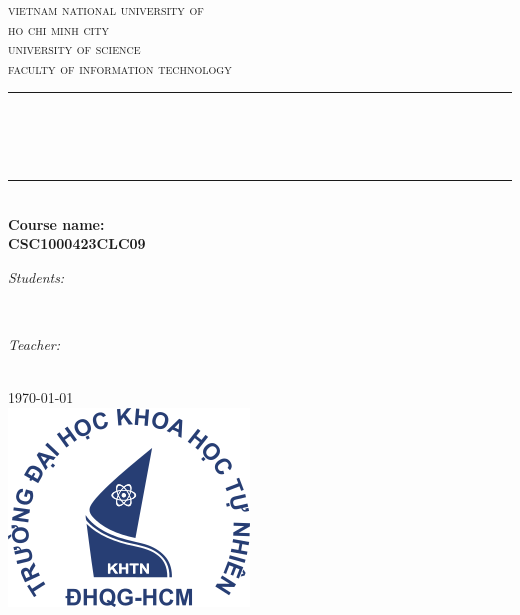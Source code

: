 \begin{titlepage}
\newcommand{\HRule}{\rule{\linewidth}{0.5mm}}
\centering

\textsc{\LARGE vietnam national university of \\ho chi minh city}\\[0.8cm]
\textsc{\Large university of science}\\[0.4cm]
\textsc{\large faculty of information technology}\\[0.4cm]

\HRule \\[0.4cm]
{ 
\Large{\bfseries{\reporttitle}}\\[0.4cm]
\huge{\bfseries{\reportname}}
}\\[0.4cm]
\HRule \\[0.4cm]

\textbf{\large Course name: \coursename}\\[0.4cm]
\textbf{\large CSC10004\textunderscore23CLC09} \\ [0.7cm]
\begin{minipage}[t]{0.4\textwidth}
\begin{flushleft} \large
\emph{Students:}\\
\studentname
\end{flushleft}
\end{minipage}
~
\begin{minipage}[t]{0.4\textwidth}
\begin{flushright} \large
\emph{Teacher:} \\
\teachername
\end{flushright}
\end{minipage}\\[0.7cm]

{\large \today}\\[1cm]

\includegraphics[scale=1.1]{img/hcmus-logo.png}\\[0cm] 

\vfill
\end{titlepage}
	